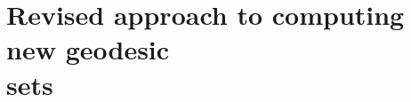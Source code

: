 \section[Revised approach to computing new geodesic level sets]
{Revised approach to computing new geodesic\\\phantom{3.6} sets}
\label{sec:revised_approach_to_computing_new_geodesic_level_sets}
